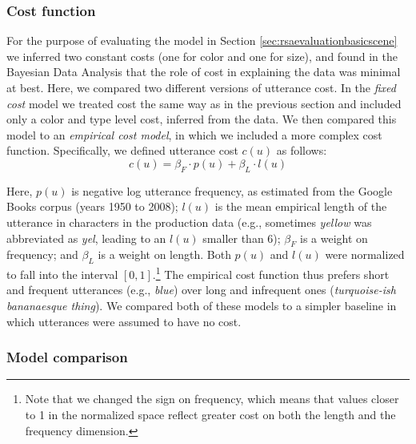 \documentclass[11pt]{article}
\newcommand{\sectionref}[1]{Section \ref{#1}}
\begin{document}
\subsubsection{Cost function}

For the purpose of evaluating the model in \sectionref{sec:rsaevaluationbasicscene} we inferred two constant costs (one for color and one for size), and found in the Bayesian Data Analysis that the role of cost in explaining the data was minimal at best. Here, we compared two different versions of utterance cost. In the \emph{fixed cost} model we treated cost the same way as in the previous section and included only a color and type level cost, inferred from the data. We then compared this model to an \emph{empirical cost model}, in which we included a more complex cost function. 
Specifically, we defined utterance cost $c(u)$ as follows:
\begin{equation} \label{eq:exp2cost}
c(u) = \beta_F\cdot p(u) + \beta_L\cdot l(u)
\end{equation}

Here, $p(u)$ is negative log utterance frequency, as estimated from the Google Books corpus (years 1950 to 2008); $l(u)$ is the mean empirical length of the utterance in characters in the production data (e.g., sometimes \emph{yellow} was abbreviated as \emph{yel}, leading to an $l(u)$ smaller than 6); $\beta_F$ is a weight on frequency; and $\beta_L$ is a weight on length. Both $p(u)$ and $l(u)$ were normalized to fall into the interval $[0,1]$.\footnote{Note that we changed the sign on frequency, which means that values closer to 1 in the normalized space reflect greater cost on both the length and the frequency dimension.} The empirical cost function thus prefers short and frequent utterances (e.g., \emph{blue}) over long and infrequent ones (\emph{turquoise-ish bananaesque thing}).
We compared both of these models to a simpler baseline in which utterances were assumed to have no cost.

\subsubsection{Model comparison}
\end{document}
